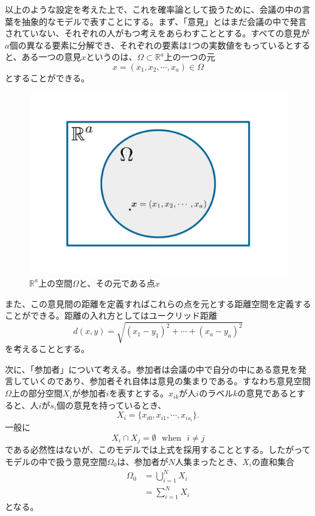 以上のような設定を考えた上で、これを確率論として扱うために、会議の中の言葉を抽象的なモデルで表すことにする。まず、「意見」とはまだ会議の中で発言されていない、それぞれの人がもつ考えをあらわすこととする。すべての意見が$a$個の異なる要素に分解でき、それぞれの要素は1つの実数値をもっているとすると、ある一つの意見$x$というのは、$\Omega \subset \mathbb{R}^{a}$上の一つの元
\[x = (x_{1}, x_{2}, \cdots ,x_{a}) \in \Omega\]
とすることができる。
\begin{figure}[H]
    \begin{center}
        \includegraphics[width=12.5cm]{../img/ideaspace.jpg}
        \caption{$\mathbb{R}^{a}$上の空間$\Omega$と、その元である点$x$}
        \label{fig:f1}
    \end{center}
\end{figure}

また、この意見間の距離を定義すればこれらの点を元とする距離空間を定義することができる。距離の入れ方としてはユークリッド距離
\[d(x, y) = \sqrt{(x_{1} - y_{1})^{2} + \cdots + (x_{a} - y_{a})^{2}}\]
を考えることとする。

次に、「参加者」について考える。参加者は会議の中で自分の中にある意見を発言していくのであり、参加者それ自体は意見の集まりである。すなわち意見空間$\Omega$上の部分空間$X_{i}$が参加者$i$を表すとする。$x_{ik}$が人$i$のラベル$k$の意見であるとすると、人$i$が$s_{i}$個の意見を持っているとき、
\[X_{i} = \{x_{i0}, x_{i1}, \cdots , x_{is_{i}}\}.\]
一般に
\[X_{i}\cap X_{j} = \emptyset\ \ \  \text{when}\ \ \ i \neq j\]
である必然性はないが、このモデルでは上式を採用することとする。したがってモデルの中で扱う意見空間$\Omega_{0}$は、参加者が$N$人集まったとき、$X_{i}$の直和集合
\begin{align}\Omega_{0} &= \bigcup_{i = 1}^{N} X_{i} \nonumber \\
&= \sum_{i=1}^{N} X_{i} \end{align}
となる。

